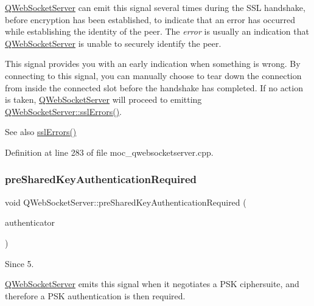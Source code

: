 \mbox{\hyperlink{class_q_web_socket_server}{Q\+Web\+Socket\+Server}} can emit this signal several times during the S\+SL handshake, before encryption has been established, to indicate that an error has occurred while establishing the identity of the peer. The {\itshape error} is usually an indication that \mbox{\hyperlink{class_q_web_socket_server}{Q\+Web\+Socket\+Server}} is unable to securely identify the peer.

This signal provides you with an early indication when something is wrong. By connecting to this signal, you can manually choose to tear down the connection from inside the connected slot before the handshake has completed. If no action is taken, \mbox{\hyperlink{class_q_web_socket_server}{Q\+Web\+Socket\+Server}} will proceed to emitting \mbox{\hyperlink{class_q_web_socket_server_a53d7949bf17ea46f265cc099e762bffb}{Q\+Web\+Socket\+Server\+::ssl\+Errors()}}.

\begin{DoxySeeAlso}{See also}
\mbox{\hyperlink{class_q_web_socket_server_a53d7949bf17ea46f265cc099e762bffb}{ssl\+Errors()}} 
\end{DoxySeeAlso}


Definition at line 283 of file moc\+\_\+qwebsocketserver.\+cpp.

\mbox{\label{class_q_web_socket_server_a6d9d92d366e222e3c3ae94ffc2bae0b4}} 
\subsubsection{\texorpdfstring{pre\+Shared\+Key\+Authentication\+Required}{preSharedKeyAuthenticationRequired}}
{\footnotesize\ttfamily void Q\+Web\+Socket\+Server\+::pre\+Shared\+Key\+Authentication\+Required (\begin{DoxyParamCaption}\item[{Q\+Ssl\+Pre\+Shared\+Key\+Authenticator $\ast$}]{authenticator }\end{DoxyParamCaption})\hspace{0.3cm}{\ttfamily [signal]}}

\begin{DoxySince}{Since}
5.
\end{DoxySince}
\mbox{\hyperlink{class_q_web_socket_server}{Q\+Web\+Socket\+Server}} emits this signal when it negotiates a P\+SK ciphersuite, and therefore a P\+SK authentication is then required.


